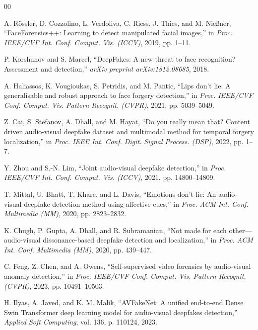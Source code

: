 \documentclass[conference]{IEEEtran}
\begin{document}

\begin{thebibliography}{00}

 A. R{\"o}ssler, D. Cozzolino, L. Verdoliva, C. Riess, J. Thies, and M. Nie{\ss}ner, ``FaceForensics++: Learning to detect manipulated facial images,'' in \textit{Proc. IEEE/CVF Int. Conf. Comput. Vis. (ICCV)}, 2019, pp. 1--11.

 P. Korshunov and S. Marcel, ``DeepFakes: A new threat to face recognition? Assessment and detection,'' \textit{arXiv preprint arXiv:1812.08685}, 2018.

 A. Haliassos, K. Vougioukas, S. Petridis, and M. Pantic, ``Lips don't lie: A generalisable and robust approach to face forgery detection,'' in \textit{Proc. IEEE/CVF Conf. Comput. Vis. Pattern Recognit. (CVPR)}, 2021, pp. 5039--5049.

 Z. Cai, S. Stefanov, A. Dhall, and M. Hayat, ``Do you really mean that? Content driven audio-visual deepfake dataset and multimodal method for temporal forgery localization,'' in \textit{Proc. IEEE Int. Conf. Digit. Signal Process. (DSP)}, 2022, pp. 1--7.

 Y. Zhou and S.-N. Lim, ``Joint audio-visual deepfake detection,'' in \textit{Proc. IEEE/CVF Int. Conf. Comput. Vis. (ICCV)}, 2021, pp. 14800--14809.

 T. Mittal, U. Bhatt, T. Khare, and L. Davis, ``Emotions don't lie: An audio-visual deepfake detection method using affective cues,'' in \textit{Proc. ACM Int. Conf. Multimedia (MM)}, 2020, pp. 2823--2832.

 K. Chugh, P. Gupta, A. Dhall, and R. Subramanian, ``Not made for each other---audio-visual dissonance-based deepfake detection and localization,'' in \textit{Proc. ACM Int. Conf. Multimedia (MM)}, 2020, pp. 439--447.

 C. Feng, Z. Chen, and A. Owens, ``Self-supervised video forensics by audio-visual anomaly detection,'' in \textit{Proc. IEEE/CVF Conf. Comput. Vis. Pattern Recognit. (CVPR)}, 2023, pp. 10491--10503.

 H. Ilyas, A. Javed, and K. M. Malik, ``AVFakeNet: A unified end-to-end Dense Swin Transformer deep learning model for audio-visual deepfakes detection,'' \textit{Applied Soft Computing}, vol. 136, p. 110124, 2023.


\end{thebibliography}
\end{document}
